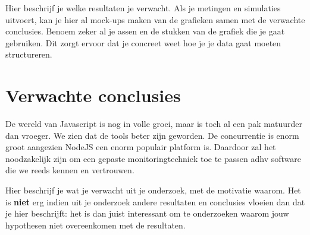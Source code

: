 Hier beschrijf je welke resultaten je verwacht. Als je metingen en simulaties uitvoert, kan je hier al mock-ups maken van de grafieken samen met de verwachte conclusies. Benoem zeker al je assen en de stukken van de grafiek die je gaat gebruiken. Dit zorgt ervoor dat je concreet weet hoe je je data gaat moeten structureren.

\section{Verwachte conclusies}
\label{sec:verwachte_conclusies}

De wereld van Javascript is nog in volle groei, maar is toch al een pak matuurder dan vroeger. We zien dat de tools beter zijn geworden. De concurrentie is enorm groot aangezien NodeJS een enorm populair platform is. Daardoor zal het noodzakelijk zijn om een gepaste monitoringtechniek toe te passen adhv software die we reeds kennen en vertrouwen. 

Hier beschrijf je wat je verwacht uit je onderzoek, met de motivatie waarom. Het is \textbf{niet} erg indien uit je onderzoek andere resultaten en conclusies vloeien dan dat je hier beschrijft: het is dan juist interessant om te onderzoeken waarom jouw hypothesen niet overeenkomen met de resultaten.

